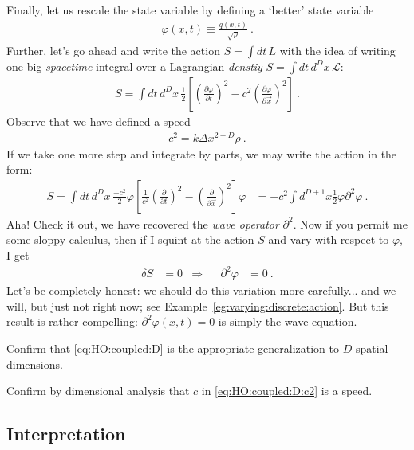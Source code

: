 Finally, let us rescale the state variable by defining a `better' state variable
\begin{align}
	\varphi(x,t) \equiv \frac{q(x,t)}{\sqrt{\rho}} \ .
	\label{eq:field:normalization}
\end{align}
Further, let's go ahead and write the action $S=\int dt \, L$ with the idea of writing one big \emph{spacetime} integral over a Lagrangian \emph{denstiy} $S = \int dt\, d^Dx \, \mathcal L$:
\begin{align}
	S = \int dt \, d^Dx \,
	\frac{1}{2}
	\left[
	\left( 
		\frac{\partial \varphi}{\partial t}
		\right)^2
	- 
	c^2
	\left(\frac{\partial \varphi}{\partial \vec{x} }\right)^2
	\right] \ .
\end{align}
Observe that we have defined a speed
\begin{align}
	c^2 = k \Delta x^{2-D} \rho \ .
	\label{eq:HO:coupled:D:c2}
\end{align}
If we take one more step and integrate by parts, we may write the action in the form:
\begin{align}
	S = \int dt \, d^Dx \,
	\frac{-c^2}{2}
	\varphi
	\left[
	\frac{1}{c^2}
	\left( 
		\frac{\partial}{\partial t}
		\right)^2
	- 
	\left(\frac{\partial }{\partial \vec{x} }\right)^2
	\right]
	\varphi 
	&=
	-c^2 \int d^{D+1}x \frac{1}{2} \varphi \partial^2 \varphi 
	\ .
\end{align}
Aha! Check it out, we have recovered the \emph{wave operator} $\partial^2$.  Now if you permit me some sloppy calculus, then if I squint at the action $S$ and vary with respect to $\varphi$, I get 
\begin{align}
	\delta S &=0 
	&\Rightarrow&&
	\partial^2 \varphi &= 0 \ .
	\label{eq:delta:S:operator:phi}
\end{align}
Let's be completely honest: we should do this variation more carefully... and we will, but just not right now; see Example~\ref{eg:varying:discrete:action}. But this result is rather compelling: $\partial^2\varphi(x,t) = 0$ is simply the wave equation.
\begin{exercise}
Confirm that \eqref{eq:HO:coupled:D} is the appropriate generalization to $D$ spatial dimensions.
\end{exercise}
\begin{exercise}
Confirm by dimensional analysis that $c$ in \eqref{eq:HO:coupled:D:c2} is a speed.
\end{exercise}

\subsection{Interpretation}

